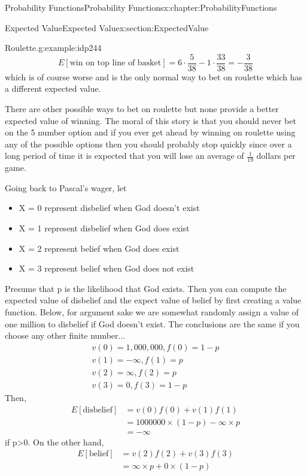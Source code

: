 \documentclass[oneside,10pt,]{book}
\numberwithin{equation}{section}
\begin{document}
\begin{chapterptx}{Probability Functions}{}{Probability Functions}{}{}{x:chapter:ProbabilityFunctions}
\begin{sectionptx}{Expected Value}{}{Expected Value}{}{}{x:section:ExpectedValue}
\begin{example}{Roulette.}{g:example:idp244}
\begin{equation*}
E[\text{win on top line of basket}] = 6 \cdot \frac{5}{38} - 1 \cdot \frac{33}{38} = - \frac{3}{38}
\end{equation*}
which is of course worse and is the only normal way to bet on roulette which has a different expected value.%
\par
There are other possible ways to bet on roulette but none provide a better expected value of winning.  The moral of this story is that you should never bet on the 5 number option and if you ever get ahead by winning on roulette using any of the possible options then you should probably stop quickly since over a long period of time it is expected that you will lose an average of \(\frac{1}{19}\) dollars per game.%
\end{example}
%
\par
Going back to Pascal's wager, let%
\begin{itemize}[label=\textbullet]
\item{}X = 0 represent disbelief when God doesn't exist%
\item{}X = 1 represent disbelief when God does exist%
\item{}X = 2 represent belief when God does exist%
\item{}X = 3 represent belief when God does not exist%
\end{itemize}
Presume that p is the likelihood that God exists. Then you can compute the expected value of disbelief and the expect value of belief by first creating a value function. Below, for argument sake we are somewhat randomly assign a value of one million to disbelief if God doesn't exist. The conclusions are the same if you choose any other finite number...%
\begin{gather*}
v(0) = 1,000,000, f(0) = 1-p\\
v(1) = -\infty, f(1) = p\\
v(2) = \infty, f(2) = p\\
v(3) = 0, f(3) = 1-p
\end{gather*}
Then,%
\begin{align*}
E[\text{disbelief}] & = v(0)f(0) + v(1)f(1)\\
& = 1000000 \times (1-p) - \infty \times p\\
& = -\infty
\end{align*}
if p\textgreater{}0. On the other hand,%
\begin{align*}
E[\text{belief}] & = v(2)f(2) + v(3)f(3)\\
& = \infty \times p + 0 \times (1-p)\\

\end{align*}
\end{sectionptx}
\end{chapterptx}
\end{document}
